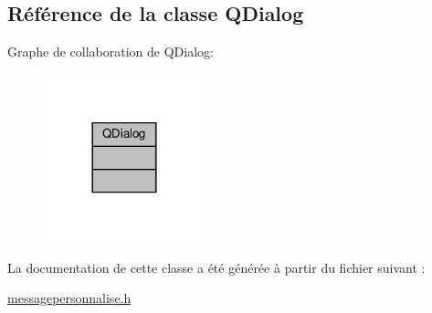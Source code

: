 \hypertarget{class_q_dialog}{}\subsection{Référence de la classe Q\+Dialog}
\label{class_q_dialog}


Graphe de collaboration de Q\+Dialog\+:
\nopagebreak
\begin{figure}[H]
\begin{center}
\leavevmode
\includegraphics[width=132pt]{class_q_dialog__coll__graph}
\end{center}
\end{figure}


La documentation de cette classe a été générée à partir du fichier suivant \+:\begin{DoxyCompactItemize}
\item 
\hyperlink{messagepersonnalise_8h}{messagepersonnalise.\+h}\end{DoxyCompactItemize}

